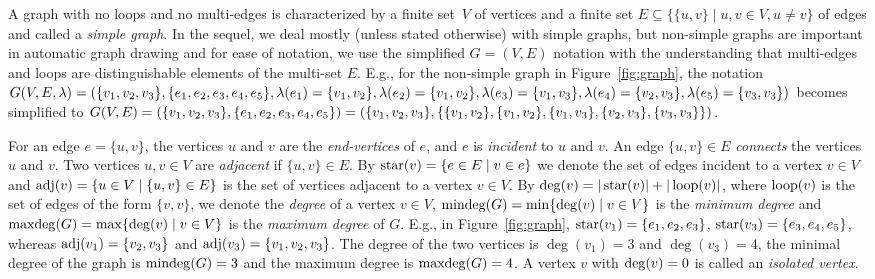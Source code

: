 \documentclass[runningheads]{cl2emult}
\begin{document}
A graph with no loops and no multi-edges is characterized by a finite
set~$V$ of vertices and a finite set $E\subseteq\{\{u,v\}\mid u,v\in
V, u\ne v\}$ of edges and called a \emph{simple graph}. In the sequel, we deal mostly (unless stated otherwise) with
simple graphs, but non-simple graphs are important in automatic graph
drawing and for ease of notation, we use the simplified $G=(V,E)$
notation with the understanding that multi-edges and loops are
distinguishable elements of the multi-set $E$. E.g., for the
non-simple graph in Figure~\ref{fig:graph}, the notation
$G(V,E,\lambda)=(\{v_1,v_2,v_3\}, \{e_1,e_2,e_3,e_4,e_5\},
\lambda(e_1)=\{v_1,v_2\},\linebreak[0]
\lambda(e_2)=\{v_1,v_2\},\linebreak[0]
\lambda(e_3)=\{v_1,v_3\},\linebreak[0]
\lambda(e_4)=\{v_2,v_3\},\linebreak[0] \lambda(e_5)=\{v_3,v_3\})$
becomes simplified to $G(V,E)=(\{v_1,v_2,v_3\},
\{e_1,e_2,e_3,e_4,e_5\})= (\{v_1,v_2,v_3\}, \{
\{v_1,v_2\},\linebreak[0]\{v_1,v_2\},\linebreak[0]\{v_1,v_3\},
\linebreak[0]\{v_2,\linebreak[0]v_3\},\linebreak[0]\{v_3,v_3\}\})$.

For an edge $e=\{u,v\}$, the vertices $u$ and $v$ are the
\emph{end-vertices} of $e$, and $e$ is
\emph{incident} to $u$ and $v$.  An edge $\{u,v\}\in E$
\emph{connects} the vertices $u$ and $v$.  Two
vertices $u,v\in V$ are \emph{adjacent} if
$\{u,v\}\in E$. By $\mathop{\rm star}(v)=\{e\in E\mid v\in
e\}$ we denote the set of edges incident to a
vertex $v\in V$ and $\mathop{\rm adj}(v)=\{u\in V\mid \{u,v\}\in
E\}$ is the set of vertices adjacent to a
vertex $v\in V$. By
$\mathop{\rm deg}(v)=|\mathop{\rm star}(v)|+|\mathop{\rm loop}(v)|$, where
$\mathop{\rm loop}(v)$  is the set of edges of the form
$\{v,v\}$, we denote the \emph{degree} of a
vertex $v\in V$, $\mathop{\rm mindeg}(G)=\min\{\deg(v)\mid v\in
V\}$ is the \emph{minimum
  degree} and $\mathop{\rm maxdeg}(G)=\max\{\deg(v)\mid v\in
V\}$ is the \emph{maximum
  degree} of $G$.  E.g., in
Figure~\ref{fig:graph}, $\mathop{\rm star}(v_1)=\{e_1,e_2,e_3\}$,
$\mathop{\rm star}(v_3)=\{e_3,e_4,e_5\}$, whereas $\mathop{\rm adj}(v_1)=\{v_2,v_3\}$ and
$\mathop{\rm adj}(v_3)=\{v_1,v_2,v_3\}$. The degree of the two vertices is
$\deg(v_1)=3$ and $\deg(v_3)=4$, the minimal degree of the graph is
$\mathop{\rm mindeg}(G)=3$ and the maximum degree is $\mathop{\rm maxdeg}(G)=4$. A vertex $v$
with $\mathop{\rm deg}(v)=0$ is called an \emph{isolated vertex}.
\end{document}
